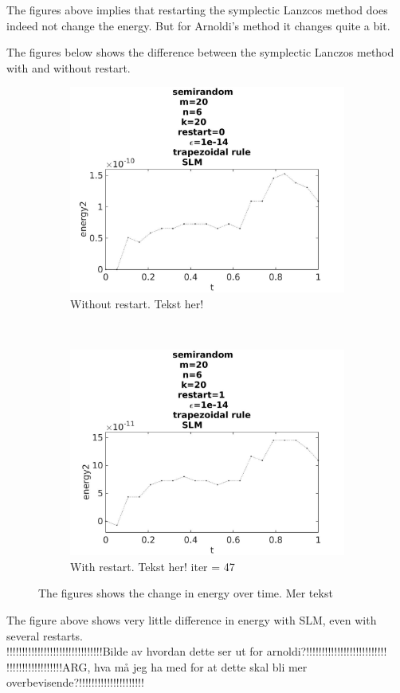The figures above implies that restarting the symplectic Lanzcos method does indeed not change the energy. But for Arnoldi's method it changes quite a bit. 

The figures below shows the difference between the symplectic Lanczos method with and without restart. 
\begin{figure}[H]
        \centering
        \begin{subfigure}[b]{0.45\textwidth}
                \includegraphics[width=\textwidth]{../MATLAB/fig/energytestrestart0.jpg}
                \caption{ Without restart. Tekst her! }
                \label{fig:intconvtrap}
        \end{subfigure}%
        ~
        \begin{subfigure}[b]{0.45\textwidth}
                \includegraphics[width=\textwidth]{../MATLAB/fig/energytestrestart1.jpg}
                \caption{ With restart.  Tekst her! iter = 47 }
                \label{fig:intconveul}
        \end{subfigure}
        \caption{ The figures shows the change in energy over time. Mer tekst  }
        \label{fig:intconv}
\end{figure}
The figure above shows very little difference in energy with SLM, even with several restarts. \\


!!!!!!!!!!!!!!!!!!!!!!!!!!!!!!!Bilde av hvordan dette ser ut for arnoldi?!!!!!!!!!!!!!!!!!!!!!!!!!!\\

!!!!!!!!!!!!!!!!!!ARG, hva må jeg ha med for at dette skal bli mer overbevisende?!!!!!!!!!!!!!!!!!!!!!

